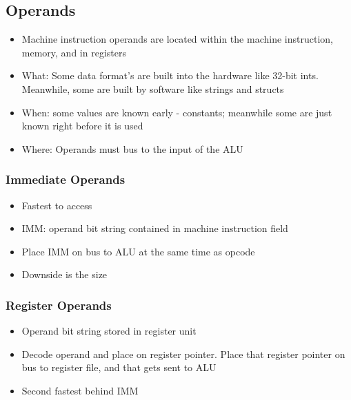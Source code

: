\documentclass{article}
\begin{document}
 \subsection{Operands}
 \begin{itemize}
 
 \item Machine instruction operands are located within the machine instruction, memory, and in registers
 
     \item What: Some data format's are built into the hardware like 32-bit ints. Meanwhile, some are built by software like strings and structs
     
     \item When: some values are known early - constants; meanwhile some are just known right before it is used
     
     \item Where: Operands must bus to the input of the ALU
     
     
 \end{itemize}
 
 \subsubsection{Immediate Operands}
 
 \begin{itemize}
 
 \item Fastest to access
     \item IMM: operand bit string contained in machine instruction field
     
     \item Place IMM on bus to ALU at the same time as opcode
     
     \item Downside is the size
     
     
 \end{itemize}
 
 \subsubsection{Register Operands}

\begin{itemize}
    \item Operand bit string stored in register unit 
    \item Decode operand and place on register pointer. Place that register pointer on bus to register file, and that gets sent to ALU
    \item Second fastest behind IMM
\end{itemize}
\end{document}
